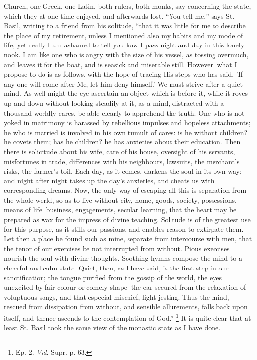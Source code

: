 Church, one Greek, one Latin, both rulers, both monks, say concerning
the state, which they at one time enjoyed, and afterwards lost.
``You tell me,'' says St. Basil, writing to a friend from his
solitude, ``that it was little for me to describe the place of my
retirement, unless I mentioned also my habits and my mode of life; yet
really I am ashamed to tell you how I pass night and day in this
lonely nook. I am like one who is angry with the size of his vessel,
as tossing overmuch, and leaves it for the boat, and is seasick and
miserable still. However, what I propose to do is as follows, with the
hope of tracing His steps who has said, 'If any one will come
after Me, let him deny himself.' We must strive after a quiet mind. As
well might the eye ascertain an object which is before it, while it
roves up and down without looking steadily at it, as a mind,
distracted with a thousand worldly cares, be able clearly to apprehend
the truth. One who is not yoked in matrimony is harassed by rebellious
impulses and hopeless attachments; he who is married is involved in
his own tumult of cares: is he without children? he covets them; has
he children? he has anxieties about their education. Then there is
solicitude about his wife, care of his house, oversight of his
servants, misfortunes in trade, differences with his neighbours,
lawsuits, the merchant's risks, the farmer's toil. Each day, as it
comes, darkens the soul in its own way; and night after night takes up
the day's anxieties, and cheats us with corresponding dreams. Now, the
only way of escaping all this is separation from the whole world, so
as to live without city, home, goods, society, possessions, means of
life, business, engagements, secular learning, that the heart may be
prepared as wax for the impress of divine teaching. Solitude is of the
greatest use for this purpose, as it stills our passions, and enables
reason to extirpate them. Let then a place be found such as mine,
separate from intercourse with men, that the tenor of our exercises be
not interrupted from without. Pious exercises nourish the soul with
divine thoughts. Soothing hymns compose the mind to a cheerful and
calm state. Quiet, then, as I have said, is the first step in our
sanctification; the tongue purified from the gossip of the world, the
eyes unexcited by fair colour or comely shape, the ear secured from
the relaxation of voluptuous songs, and that especial mischief, light
jesting. Thus the mind, rescued from dissipation from without,
and sensible allurements, falls back upon itself, and thence ascends
to the contemplation of God.'' \footnote{Ep. 2. \emph{Vid}.
Supr. p. 63.} It is quite clear that at least St. Basil took the same view of
the monastic state as I have done.

